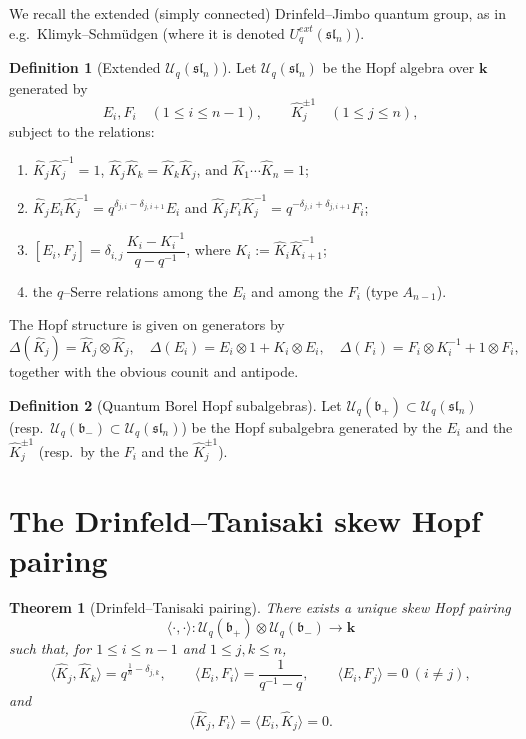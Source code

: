 \documentclass[11pt]{article}
\newtheorem{theorem}{Theorem}
\theoremstyle{definition}
\newtheorem{definition}{Definition}
\newcommand{\Bbbk}{\mathbf{k}}
\newcommand{\Uc}{\mathcal{U}}
\newcommand{\fsl}{\mathfrak{sl}}
\newcommand{\fb}{\mathfrak{b}}
\newcommand{\del}{\delta}
\newcommand{\tensor}{\otimes}
\newcommand{\la}{\langle}
\newcommand{\ra}{\rangle}
\newcommand{\Khat}{\widehat{K}}
\newcommand{\E}{E}
\newcommand{\F}{F}
\begin{document}
We recall the extended (simply connected) Drinfeld--Jimbo quantum group, as in e.g.\ Klimyk--Schm\"udgen (where it is denoted $U_q^{ext}(\fsl_n)$).

\begin{definition}[Extended $\Uc_q(\fsl_n)$]
Let $\Uc_q(\fsl_n)$ be the Hopf algebra over $\Bbbk$ generated by
\[
\E_i,\F_i\quad (1\le i\le n-1), 
\qquad
\Khat_j^{\pm 1}\quad (1\le j\le n),
\]
subject to the relations:
\begin{enumerate}[label=(\roman*)]
\item $\Khat_j\Khat_j^{-1}=1$, $\Khat_j\Khat_k=\Khat_k\Khat_j$, and $\Khat_1\cdots \Khat_n=1$;
\item $\Khat_j \E_i \Khat_j^{-1}=q^{\del_{j,i}-\del_{j,i+1}}\E_i$ and $\Khat_j \F_i \Khat_j^{-1}=q^{-\del_{j,i}+\del_{j,i+1}}\F_i$;
\item $[\E_i,\F_j]=\del_{i,j}\,\dfrac{K_i-K_i^{-1}}{q-q^{-1}}$, where $K_i:=\Khat_i\Khat_{i+1}^{-1}$;
\item the $q$--Serre relations among the $\E_i$ and among the $\F_i$ (type $A_{n-1}$).
\end{enumerate}
The Hopf structure is given on generators by
\[
\Delta(\Khat_j)=\Khat_j\tensor \Khat_j,\quad
\Delta(\E_i)=\E_i\tensor 1 + K_i\tensor \E_i,\quad
\Delta(\F_i)=\F_i\tensor K_i^{-1}+1\tensor \F_i,
\]
together with the obvious counit and antipode.
\end{definition}

\begin{definition}[Quantum Borel Hopf subalgebras]
Let $\Uc_q(\fb_+)\subset \Uc_q(\fsl_n)$ (resp.\ $\Uc_q(\fb_-)\subset \Uc_q(\fsl_n)$) be the Hopf subalgebra generated by the $\E_i$ and the $\Khat_j^{\pm1}$ (resp.\ by the $\F_i$ and the $\Khat_j^{\pm1}$).
\end{definition}


\section{The Drinfeld--Tanisaki skew Hopf pairing}

\begin{theorem}[Drinfeld--Tanisaki pairing]\label{thm:DT-pairing}
There exists a unique skew Hopf pairing
\[
\la\cdot,\cdot\ra:\Uc_q(\fb_+)\tensor \Uc_q(\fb_-)\to \Bbbk
\]
such that, for $1\le i\le n-1$ and $1\le j,k\le n$,
\begin{equation}\label{eq:pairing-on-gens}
\la \Khat_j,\Khat_k\ra = q^{\frac1n-\del_{j,k}},\qquad
\la \E_i,\F_i\ra=\frac{1}{q^{-1}-q},\qquad
\la \E_i,\F_j\ra=0\ (i\ne j),
\end{equation}
and
\[
\la \Khat_j,\F_i\ra=\la \E_i,\Khat_j\ra=0.
\]
\end{theorem}
\end{document}
